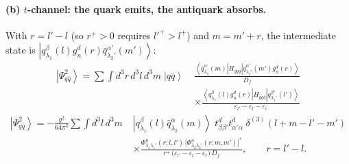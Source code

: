 \documentclass[11pt]{article}
\newcommand{\eps}{\varepsilon}
\newcommand{\dthree}{\delta^{(3)}}
\newcommand{\ket}[1]{\left|#1\right\rangle}
\newcommand{\bra}[1]{\left\langle#1\right|}
\newcommand{\Ph}{\Phi}
\newcommand{\qk}[3]{q^{#1}_{#2}(#3)}
\newcommand{\aqk}[3]{\bar q^{#1}_{#2}(#3)}
\newcommand{\gl}[3]{g^{#1}_{#2}(#3)}
\begin{document}
\paragraph{(b) $t$-channel: the quark emits, the antiquark absorbs.}
\begin{center}
\end{center}
With $r=l'-l$ (so $r^{+}>0$ requires $l'^{+}>l^{+}$) and $m=m'+r$, the intermediate state is
$\ket{\qk{\beta}{\lambda_{1}}{l}\gl{d}{n}{r}\aqk{\alpha'}{\lambda_{2}'}{m'}}$:
\begin{align}
\ket{\Psi^{2}_{q\bar q}}=\sum\int\! d^{3}r\,d^{3}l\,d^{3}m\;\ket{q\bar q}\;
&\frac{\bra{\aqk{\alpha}{\lambda_{2}}{m}}H_{gq\bar q}
\ket{\aqk{\alpha'}{\lambda_{2}'}{m'}\gl{d}{n}{r}}}{D_{f}}
\nonumber\\&\times
\frac{\bra{\qk{\beta}{\lambda_{1}}{l}\gl{d}{n}{r}}H_{gq\bar q}\ket{\qk{\beta'}{\lambda_{1}'}{l'}}}
{\eps_{l'}-\eps_{l}-\eps_{r}}
\end{align}
\begin{align}
\ket{\Psi^{2}_{q\bar q}}=-\frac{g^{2}}{64\pi^{3}}\sum\int\!d^{3}l\,d^{3}m\;
&\ket{\qk{\beta}{\lambda_{1}}{l}\aqk{\alpha}{\lambda_{2}}{m}}\;
t^{d}_{\beta\beta'}t^{d}_{\alpha'\alpha}\;\dthree(l+m-l'-m')
\nonumber\\&\times
\frac{\Ph^{n}_{\lambda_{1}\lambda_{1}'}(r;l,l')\,
\big[\Ph^{n}_{\lambda_{2}\lambda_{2}'}(r;m,m')\big]^{*}}
{r^{+}\,\big(\eps_{l'}-\eps_{l}-\eps_{r}\big)\,D_{f}},\qquad r=l'-l .
\label{eq:E1b}
\end{align}
\end{document}
